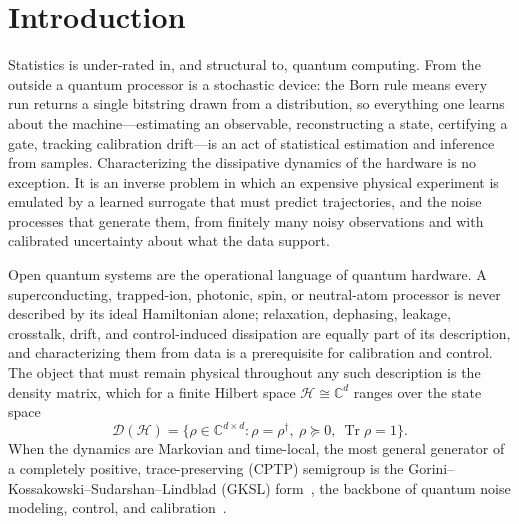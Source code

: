 \documentclass[twocolumn,aps,prxquantum,superscriptaddress,nofootinbib,floatfix,longbibliography]{revtex4-2}
\DeclareMathOperator{\Tr}{Tr}
\newcommand{\C}{\mathbb{C}}
\newcommand{\calD}{\mathcal{D}}
\newcommand{\hilb}{\mathcal{H}}
\begin{document}
\maketitle

\section{Introduction}
\label{sec:introduction}

Statistics is under-rated in, and structural to, quantum computing. From the outside a quantum processor is a stochastic device: the Born rule means every run returns a single bitstring drawn from a distribution, so everything one learns about the machine---estimating an observable, reconstructing a state, certifying a gate, tracking calibration drift---is an act of statistical estimation and inference from samples. Characterizing the dissipative dynamics of the hardware is no exception. It is an inverse problem in which an expensive physical experiment is emulated by a learned surrogate that must predict trajectories, and the noise processes that generate them, from finitely many noisy observations and with calibrated uncertainty about what the data support.

Open quantum systems are the operational language of quantum hardware. A superconducting, trapped-ion, photonic, spin, or neutral-atom processor is never described by its ideal Hamiltonian alone; relaxation, dephasing, leakage, crosstalk, drift, and control-induced dissipation are equally part of its description, and characterizing them from data is a prerequisite for calibration and control. The object that must remain physical throughout any such description is the density matrix, which for a finite Hilbert space $\hilb\cong\C^d$ ranges over the state space
\begin{equation}
    \calD(\hilb)=\{\rho\in\C^{d\times d}:\rho=\rho^\dagger,\ \rho\succeq0,\ \Tr\rho=1\}.
    \label{eq:state_space}
\end{equation}
When the dynamics are Markovian and time-local, the most general generator of a completely positive, trace-preserving (CPTP) semigroup is the Gorini--Kossakowski--Sudarshan--Lindblad (GKSL) form~\cite{lindblad1976generators,gorini1976completely,breuer2002theory}, the backbone of quantum noise modeling, control, and calibration~\cite{wiseman2009quantum,krantz2019quantum,leibfried2003quantum,preskill2018quantum}.
\end{document}

